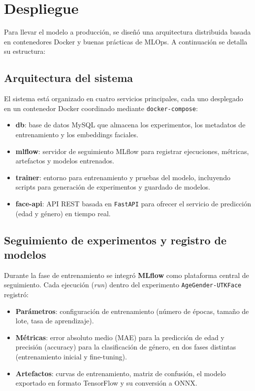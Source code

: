 \section{Despliegue}

Para llevar el modelo a producción, se diseñó una arquitectura distribuida basada en contenedores Docker y buenas prácticas de MLOps. A continuación se detalla su estructura:

\subsection{Arquitectura del sistema}
El sistema está organizado en cuatro servicios principales, cada uno desplegado en un contenedor Docker coordinado mediante \texttt{docker-compose}:

\begin{itemize}
  \item \textbf{db}: base de datos MySQL que almacena los experimentos, los metadatos de entrenamiento y los embeddings faciales.
  \item \textbf{mlflow}: servidor de seguimiento MLflow para registrar ejecuciones, métricas, artefactos y modelos entrenados.
  \item \textbf{trainer}: entorno para entrenamiento y pruebas del modelo, incluyendo scripts para generación de experimentos y guardado de modelos.
  \item \textbf{face-api}: API REST basada en \texttt{FastAPI} para ofrecer el servicio de predicción (edad y género) en tiempo real.
\end{itemize}

\subsection{Seguimiento de experimentos y registro de modelos}
Durante la fase de entrenamiento se integró \textbf{MLflow} como plataforma central de seguimiento. Cada ejecución (\textit{run}) dentro del experimento \texttt{AgeGender-UTKFace} registró:

\begin{itemize}
  \item \textbf{Parámetros}: configuración de entrenamiento (número de épocas, tamaño de lote, tasa de aprendizaje).
  \item \textbf{Métricas}: error absoluto medio (MAE) para la predicción de edad y precisión (accuracy) para la clasificación de género, en dos fases distintas (entrenamiento inicial y fine-tuning).
  \item \textbf{Artefactos}: curvas de entrenamiento, matriz de confusión, el modelo exportado en formato TensorFlow y su conversión a ONNX.
\end{itemize}


